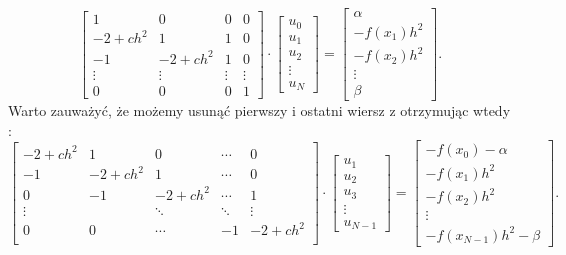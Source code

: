 \documentclass[12pt,a4paper]{report}
\begin{document}
$$ 
\left[ \begin{array}{cccc}
1 & 0 & 0 & 0 \\
-2+ch^2 & 1 & 1 & 0 \\
-1 & -2+ch^2 & 1 & 0 \\
\vdots & \vdots & \vdots & \vdots \\
0 & 0 & 0 & 1 
\end{array} \right] \cdot
\left[ \begin{array}{c}
u_0 \\
u_1 \\
u_2 \\
\vdots \\
u_{N}  
\end{array} \right] =
\left[ \begin{array}{c}
\alpha \\
-f(x_1)h^2 \\
-f(x_2)h^2\\
\vdots \\
\beta   
\end{array} \right] .
$$
Warto zauważyć, że możemy usunąć pierwszy i ostatni wiersz z otrzymując  wtedy :
$$
\left[ \begin{array}{ccccc}
-2+ch^2 & 1 & 0 & \cdots & 0 \\
-1 & -2+ch^2 & 1& \cdots & 0 \\
0 & -1 & -2+ch^2& \cdots & 1 \\
\vdots &  & \ddots & \ddots & \vdots \\ 
0 & 0 & \cdots & -1 & -2+ch^2 \\
\end{array} \right] \cdot
\left[ \begin{array}{c}
u_1 \\
u_2 \\
u_3 \\
\vdots \\
u_{N-1} 
\end{array} \right] =
\left[ \begin{array}{c}
-f(x_0)-\alpha \\
-f(x_1)h^2 \\
-f(x_2)h^2\\
\vdots \\
-f(x_{N-1})h^2 -\beta    
\end{array} \right] . 
$$
\end{document}
